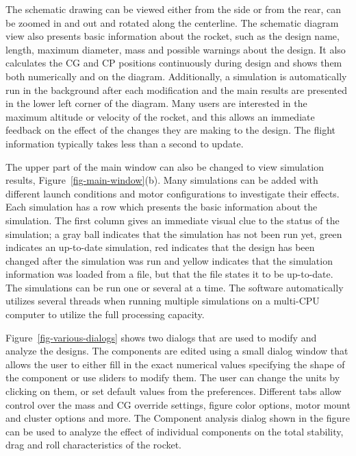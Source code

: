 The schematic drawing can be viewed either from the side or from the
rear, can be zoomed in and out and rotated along the centerline.  The
schematic diagram view also presents basic information about the
rocket, such as the design name, length, maximum diameter, mass and
possible warnings about the design. It also calculates the CG and CP
positions continuously during design and shows them both numerically
and on the diagram.  Additionally, a simulation is automatically run
in the background after each modification and the main results are
presented in the lower left corner of the diagram.  Many users are
interested in the maximum altitude or velocity of the rocket, and this
allows an immediate feedback on the effect of the changes they are
making to the design.  The flight information typically takes less
than a second to update.

The upper part of the main window can also be changed to view
simulation results, Figure~\ref{fig-main-window}(b).  Many simulations
can be added with different launch conditions and motor configurations
to investigate their effects.  Each simulation has a row which
presents the basic information about the simulation.  The first column
gives an immediate visual clue to the status of the simulation; a gray
ball indicates that the simulation has not been run yet, green
indicates an up-to-date simulation, red indicates that the design has
been changed after the simulation was run and yellow indicates that
the simulation information was loaded from a file, but that the file
states it to be up-to-date.  The simulations can be run one or several
at a time.  The software automatically utilizes several threads when
running multiple simulations on a multi-CPU computer to utilize the
full processing capacity.

Figure~\ref{fig-various-dialogs} shows two dialogs that are used
to modify and analyze the designs.  The components are edited using a
small dialog window that allows the user to either fill in the exact
numerical values specifying the shape of the component or use sliders
to modify them.  The user can change the units by clicking on them, or
set default values from the preferences.  Different tabs allow control
over the mass and CG override settings, figure color options, motor
mount and cluster options and more.  The Component analysis dialog
shown in the figure can be used to analyze the effect of individual
components on the total stability, drag and roll characteristics of
the rocket.

